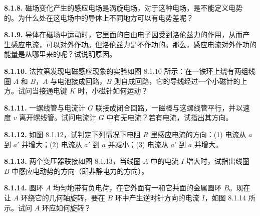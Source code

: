 \textbf{8.1.8.} 磁场变化产生的感应电场是涡旋电场，对于这种电场，是不能定义电势的。为什么处在这电场中的导体上不同地方可以有电势差呢？

\vfill
\newpage

\textbf{8.1.9.} 导体在磁场中运动时，它里面的自由电子因受到洛伦兹力的作用，从而产生感应电流，可以对外作功。但洛伦兹力是不作功的。那么，感应电流对外作功的能量是从哪里来的呢？试说明原因。

\vfill
\newpage

\textbf{8.1.10.} 法拉第发现电磁感应现象的实验如图 8.1.10 所示：在一铁环上绕有两组线圈 $A$ 和 $B$，$A$ 与电池接成回路，$B$ 则自成回路，它的导线经过一个小磁针的上方。试问当接通电键 $K$ 时，小磁针如何运动？

\begin{center}
\end{center}

\vfill
\newpage

\textbf{8.1.11.} 一螺线管与电流计 $G$ 联接成闭合回路，一磁棒与这螺线管平行，并以速度 $v$ 离开螺线管。试问电流计 $G$ 中有无电流？若有电流，试指出其方向。

\vfill
\newpage

\textbf{8.1.12.} 如图 8.1.12，试判定下列情况下电阻 $R$ 里感应电流的方向：(1) 电流从 $a$ 到 $a'$ 并增大；(2) 电流从 $a'$ 到 $a$ 并减小；(3) 电流从 $a'$ 到 $a$ 并增大。

\begin{center}
\end{center}

\vfill
\newpage

\textbf{8.1.13.} 两个变压器联接如图 8.1.13，当线圈 $A$ 中的电流 $I$ 增大时，试指出线圈 $B$ 中感应电动势的方向（即非静电力的方向）。

\begin{center}
\end{center}

\vfill
\newpage

\textbf{8.1.14.} 圆环 $A$ 均匀地带有负电荷，在它外面有一和它共面的金属圆环 $B$。现在让 $A$ 环绕它的几何轴旋转，要在 $B$ 环中产生逆时针方向的电流 $I$，如图 8.1.14 所示。试问 $A$ 环应如何旋转？

\begin{center}
\end{center}

